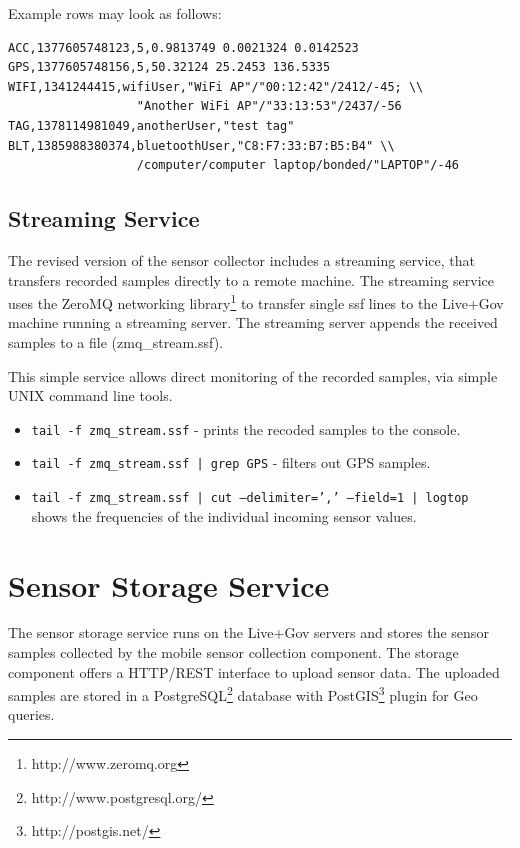 Example rows may look as follows:
\small
\begin{verbatim}
ACC,1377605748123,5,0.9813749 0.0021324 0.0142523
GPS,1377605748156,5,50.32124 25.2453 136.5335
WIFI,1341244415,wifiUser,"WiFi AP"/"00:12:42"/2412/-45; \\
                  "Another WiFi AP"/"33:13:53"/2437/-56
TAG,1378114981049,anotherUser,"test tag"
BLT,1385988380374,bluetoothUser,"C8:F7:33:B7:B5:B4" \\
                  /computer/computer laptop/bonded/"LAPTOP"/-46
\end{verbatim}
\normalsize

\subsection{Streaming Service}\label{sec:straming}

The revised version of the sensor collector includes a streaming
service, that transfers recorded samples directly to a remote machine.
The streaming service uses the ZeroMQ networking
library\footnote{http://www.zeromq.org} to transfer single ssf lines
to the Live+Gov machine running a streaming server. The streaming
server appends the received samples to a file (zmq\_stream.ssf).

This simple service allows direct monitoring of the recorded samples,
via simple UNIX command line tools. 
\begin{itemize}
\item \texttt{tail -f zmq\_stream.ssf} - prints the recoded samples to the console.
\item \texttt{tail -f zmq\_stream.ssf | grep GPS} - filters out GPS samples.
\item \texttt{tail -f zmq\_stream.ssf | cut --delimiter=',' --field=1 | logtop}\\
  shows the frequencies of the individual incoming sensor values.
\end{itemize}

\section{Sensor Storage Service}

The sensor storage service runs on the Live+Gov servers and stores the
sensor samples collected by the mobile sensor collection component.
The storage component offers a HTTP/REST interface to upload sensor
data.  The uploaded samples are stored in a
PostgreSQL\footnote{http://www.postgresql.org/} database with
PostGIS\footnote{http://postgis.net/} plugin for Geo queries.

